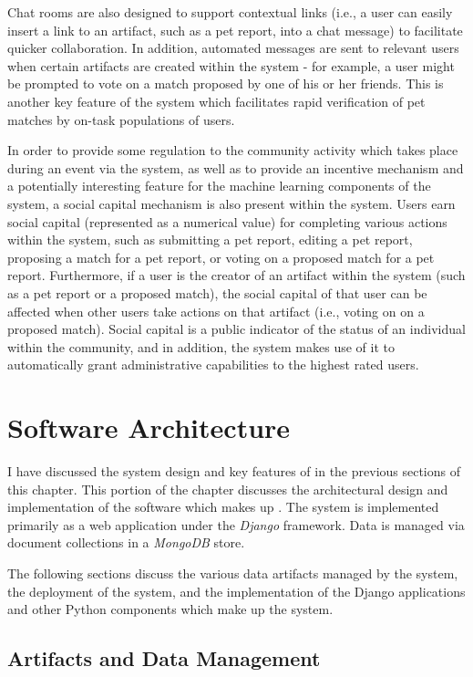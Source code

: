 Chat rooms are also designed to support contextual links (i.e., a user can easily insert a link to an artifact, such as a pet report, into a chat message) to facilitate quicker collaboration.  In addition, automated messages are sent to relevant users when certain artifacts are created within the system - for example, a user might be prompted to vote on a match proposed by one of his or her friends.  This is another key feature of the system which facilitates rapid verification of pet matches by on-task populations of users.

In order to provide some regulation to the community activity which takes place during an event via the system, as well as to provide an incentive mechanism and a potentially interesting feature for the machine learning components of the system, a social capital mechanism is also present within the system.  Users earn social capital (represented as a numerical value) for completing various actions within the system, such as submitting a pet report, editing a pet report, proposing a match for a pet report, or voting on a proposed match for a pet report.  Furthermore, if a user is the creator of an artifact within the system (such as a pet report or a proposed match), the social capital of that user can be affected when other users take actions on that artifact (i.e., voting on on a proposed match).  Social capital is a public indicator of the status of an individual within the community, and in addition, the system makes use of it to automatically grant administrative capabilities to the highest rated users.

\section {Software Architecture}

I have discussed the system design and key features of \nplh{} in the previous sections of this chapter.  
This portion of the chapter discusses the architectural design and implementation of the software which makes up \nplh.  The system is implemented primarily as a web application under the {\em Django} framework.  Data is managed via document collections in a {\em MongoDB} store.

The following sections discuss the various data artifacts managed by the system, the deployment of the system, and the implementation of the Django applications and other Python components which make up the system.

\subsection {Artifacts and Data Management}

